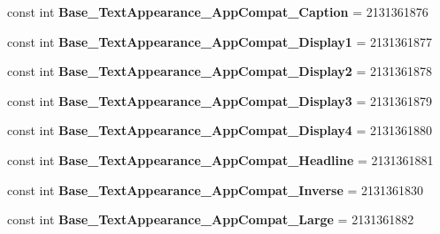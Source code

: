 \begin{DoxyCompactItemize}
\item 
\mbox{\label{classXaria_1_1Resource_1_1Style_a4c3d10dc4c21f5fe2a75bca326e4c87e}} 
const int {\bfseries Base\+\_\+\+Text\+Appearance\+\_\+\+App\+Compat\+\_\+\+Caption} = 2131361876
\item 
\mbox{\label{classXaria_1_1Resource_1_1Style_a3b7b15385b3d1b3528ad9e3d054c559b}} 
const int {\bfseries Base\+\_\+\+Text\+Appearance\+\_\+\+App\+Compat\+\_\+\+Display1} = 2131361877
\item 
\mbox{\label{classXaria_1_1Resource_1_1Style_a7b20c293282aab1e0363dff836d05743}} 
const int {\bfseries Base\+\_\+\+Text\+Appearance\+\_\+\+App\+Compat\+\_\+\+Display2} = 2131361878
\item 
\mbox{\label{classXaria_1_1Resource_1_1Style_a2d32e5ba8ebf0e33b992f5b337ad20b4}} 
const int {\bfseries Base\+\_\+\+Text\+Appearance\+\_\+\+App\+Compat\+\_\+\+Display3} = 2131361879
\item 
\mbox{\label{classXaria_1_1Resource_1_1Style_ace6bd0f8e048725536377398eba86972}} 
const int {\bfseries Base\+\_\+\+Text\+Appearance\+\_\+\+App\+Compat\+\_\+\+Display4} = 2131361880
\item 
\mbox{\label{classXaria_1_1Resource_1_1Style_a0c46a83f615afa12ffee4d300aa695cf}} 
const int {\bfseries Base\+\_\+\+Text\+Appearance\+\_\+\+App\+Compat\+\_\+\+Headline} = 2131361881
\item 
\mbox{\label{classXaria_1_1Resource_1_1Style_ad62b5ddb175d1daa9f5c84b810aa235b}} 
const int {\bfseries Base\+\_\+\+Text\+Appearance\+\_\+\+App\+Compat\+\_\+\+Inverse} = 2131361830
\item 
\mbox{\label{classXaria_1_1Resource_1_1Style_ac44b56c0a1c85eb005905e31e88aa8df}} 
const int {\bfseries Base\+\_\+\+Text\+Appearance\+\_\+\+App\+Compat\+\_\+\+Large} = 2131361882
\item 
\mbox{\label{classXaria_1_1Resource_1_1Style_a289c2bd567b4858eee657a6a8dcd6a16}} 

\end{DoxyCompactItemize}
